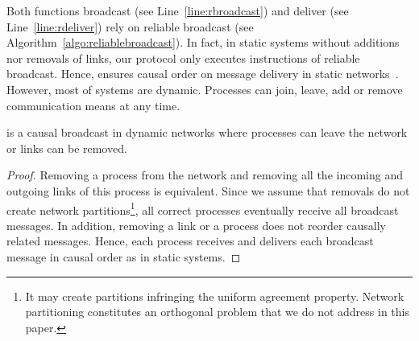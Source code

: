 Both functions broadcast (see Line~\ref{line:rbroadcast}) and deliver (see
Line~\ref{line:rdeliver}) rely on reliable broadcast (see
Algorithm~\ref{algo:reliablebroadcast}). In fact, in static systems without
additions nor removals of links, our protocol only executes instructions of
reliable broadcast. Hence, \CBROADCAST ensures causal order on message delivery
in static networks~\cite{friedman2004causal}. However, most of systems are
dynamic. Processes can join, leave, add or remove communication means at any
time.






\begin{lemma}
  \CBROADCAST is a causal broadcast in dynamic networks where processes can
  leave the network or links can be removed.
\end{lemma}

\begin{proof}
  Removing a process from the network and removing all the incoming and outgoing
  links of this process is equivalent. Since we assume that removals do not
  create network partitions\footnote{It may create partitions infringing the
    uniform agreement property. Network partitioning constitutes an orthogonal
    problem that we do not address in this paper.}, all correct processes
  eventually receive all broadcast messages. In addition, removing a link or a
  process does not reorder causally related messages. Hence, each process
  receives and delivers each broadcast message in causal order as in static
  systems.
\end{proof}

